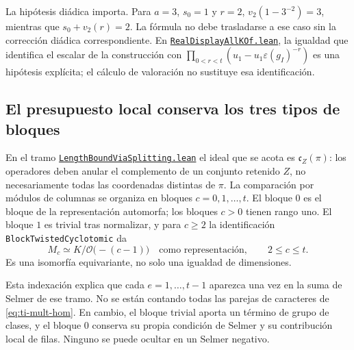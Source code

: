 La hipótesis diádica importa. Para $a=3$, $s_0=1$ y $r=2$,
$v_2(1-3^{-2})=3$, mientras que $s_0+v_2(r)=2$.
La fórmula no debe trasladarse a ese caso sin la corrección
diádica correspondiente.
En \href{https://github.com/CocoSgt/riemann-hypothesis-lean/blob/7cbf7a0c32fca1badf05931879a37c3f8a2b03b4/src/Formalism/AdmissibleDesigns/RealDisplayAllKOf.lean}{\nolinkurl{RealDisplayAllKOf.lean}}, la igualdad que identifica
el escalar de la construcción con
$\prod_{0<r<t}(u_1-u_1\varepsilon(g_I)^{-r})$ es una hipótesis
explícita; el cálculo de valoración no sustituye esa identificación.

\subsection{El presupuesto local conserva los tres tipos de bloques}
\label{subsec:ti-presupuesto-local}

En el tramo \href{https://github.com/CocoSgt/riemann-hypothesis-lean/blob/7cbf7a0c32fca1badf05931879a37c3f8a2b03b4/src/Formalism/WachLatticeTwists/RamifiedBlockRings/RamifiedBlockProofs/LengthBoundViaSplitting.lean}{\nolinkurl{LengthBoundViaSplitting.lean}} el ideal que se
acota es $\mathfrak c_Z(\pi)$: los operadores deben anular el
complemento de un conjunto retenido $Z$, no necesariamente todas
las coordenadas distintas de $\pi$.
La comparación por módulos de columnas se organiza en bloques
$c=0,1,\ldots,t$. El bloque $0$ es el bloque de la representación
automorfa; los bloques $c>0$ tienen rango uno.
El bloque $1$ es trivial tras normalizar, y para $c\ge2$ la
identificación \texttt{BlockTwistedCyclotomic} da
\begin{equation}
 M_c\simeq K/\mathcal O\bigl(-(c-1)\bigr)
 \quad\text{como representación},\qquad 2\le c\le t.
 \label{eq:ti-bloques-negativos}
\end{equation}
Es una isomorfía equivariante, no solo una igualdad de dimensiones.

Esta indexación explica que cada $e=1,\ldots,t-1$ aparezca una
vez en la suma de Selmer de ese tramo. No se están contando todas
las parejas de caracteres de \eqref{eq:ti-mult-hom}.
En cambio, el bloque trivial aporta un término de grupo de clases,
y el bloque $0$ conserva su propia condición de Selmer y su
contribución local de filas. Ninguno se puede ocultar en un
Selmer negativo.

